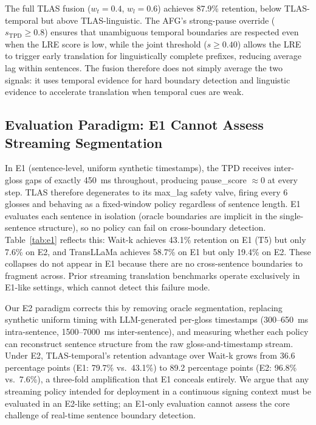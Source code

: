 \documentclass[conference]{IEEEtran}
\begin{document}
The full TLAS fusion ($w_t=0.4$, $w_l=0.6$) achieves 87.9\% retention, below TLAS-temporal but above TLAS-linguistic. The AFG's strong-pause override ($s_{\mathrm{TPD}} \geq 0.8$) ensures that unambiguous temporal boundaries are respected even when the LRE score is low, while the joint threshold ($s \geq 0.40$) allows the LRE to trigger early translation for linguistically complete prefixes, reducing average lag within sentences. The fusion therefore does not simply average the two signals: it uses temporal evidence for hard boundary detection and linguistic evidence to accelerate translation when temporal cues are weak.

\subsection{Evaluation Paradigm: E1 Cannot Assess Streaming Segmentation}

In E1 (sentence-level, uniform synthetic timestamps), the TPD receives inter-gloss gaps of exactly 450~ms throughout, producing pause\_score $\approx 0$ at every step. TLAS therefore degenerates to its max\_lag safety valve, firing every 6 glosses and behaving as a fixed-window policy regardless of sentence length. E1 evaluates each sentence in isolation (oracle boundaries are implicit in the single-sentence structure), so no policy can fail on cross-boundary detection. Table~\ref{tab:e1} reflects this: Wait-k achieves 43.1\% retention on E1 (T5) but only 7.6\% on E2, and TransLLaMa achieves 58.7\% on E1 but only 19.4\% on E2. These collapses do not appear in E1 because there are no cross-sentence boundaries to fragment across. Prior streaming translation benchmarks operate exclusively in E1-like settings, which cannot detect this failure mode.

Our E2 paradigm corrects this by removing oracle segmentation, replacing synthetic uniform timing with LLM-generated per-gloss timestamps (300--650~ms intra-sentence, 1500--7000~ms inter-sentence), and measuring whether each policy can reconstruct sentence structure from the raw gloss-and-timestamp stream. Under E2, TLAS-temporal's retention advantage over Wait-k grows from 36.6 percentage points (E1: 79.7\% vs.\ 43.1\%) to 89.2 percentage points (E2: 96.8\% vs.\ 7.6\%), a three-fold amplification that E1 conceals entirely. We argue that any streaming policy intended for deployment in a continuous signing context must be evaluated in an E2-like setting; an E1-only evaluation cannot assess the core challenge of real-time sentence boundary detection.
\end{document}
